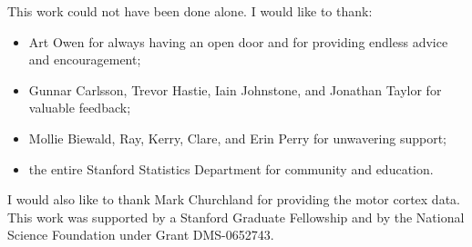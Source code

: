 
This work could not have been done alone.  I would like to thank:
\begin{itemize}
    \item Art Owen for always having an open door and for providing
        endless advice and encouragement;
    \item Gunnar Carlsson, Trevor Hastie, Iain Johnstone, 
        and Jonathan Taylor for valuable feedback;
    \item Mollie Biewald, Ray, Kerry, Clare, and Erin Perry for
        unwavering support;
    \item the entire Stanford Statistics Department for community and
        education.
\end{itemize}
I would also like to thank Mark Churchland for providing the motor
cortex data.  This work was supported by a Stanford Graduate Fellowship
and by the National Science Foundation under Grant DMS-0652743.
